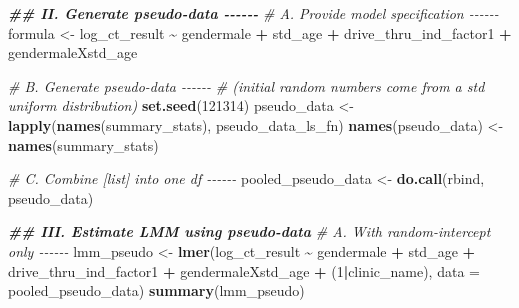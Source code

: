 \documentclass[
]{article}
\newenvironment{Shaded}{\begin{snugshade}}{\end{snugshade}}
\newcommand{\AttributeTok}[1]{\textcolor[rgb]{0.13,0.29,0.53}{#1}}
\newcommand{\CommentTok}[1]{\textcolor[rgb]{0.56,0.35,0.01}{\textit{#1}}}
\newcommand{\DecValTok}[1]{\textcolor[rgb]{0.00,0.00,0.81}{#1}}
\newcommand{\DocumentationTok}[1]{\textcolor[rgb]{0.56,0.35,0.01}{\textbf{\textit{#1}}}}
\newcommand{\FunctionTok}[1]{\textcolor[rgb]{0.13,0.29,0.53}{\textbf{#1}}}
\newcommand{\NormalTok}[1]{#1}
\newcommand{\OtherTok}[1]{\textcolor[rgb]{0.56,0.35,0.01}{#1}}
\newcommand{\SpecialCharTok}[1]{\textcolor[rgb]{0.81,0.36,0.00}{\textbf{#1}}}
\begin{document}
\begin{Shaded}
\begin{Highlighting}[]
\DocumentationTok{\#\# II. Generate pseudo{-}data {-}{-}{-}{-}{-}{-}}
\CommentTok{\# A. Provide model specification {-}{-}{-}{-}{-}{-}}
\NormalTok{formula }\OtherTok{\textless{}{-}}\NormalTok{ log\_ct\_result }\SpecialCharTok{\textasciitilde{}}\NormalTok{ gendermale }\SpecialCharTok{+}\NormalTok{ std\_age }\SpecialCharTok{+}\NormalTok{ drive\_thru\_ind\_factor1 }\SpecialCharTok{+}\NormalTok{ gendermaleXstd\_age }




\CommentTok{\# B. Generate pseudo{-}data {-}{-}{-}{-}{-}{-}}
\CommentTok{\# (initial random numbers come from a std uniform distribution)}
\FunctionTok{set.seed}\NormalTok{(}\DecValTok{121314}\NormalTok{)}
\NormalTok{pseudo\_data }\OtherTok{\textless{}{-}} \FunctionTok{lapply}\NormalTok{(}\FunctionTok{names}\NormalTok{(summary\_stats), pseudo\_data\_ls\_fn)}
\FunctionTok{names}\NormalTok{(pseudo\_data) }\OtherTok{\textless{}{-}} \FunctionTok{names}\NormalTok{(summary\_stats)}

\CommentTok{\# C. Combine [list] into one df {-}{-}{-}{-}{-}{-}}
\NormalTok{pooled\_pseudo\_data }\OtherTok{\textless{}{-}} \FunctionTok{do.call}\NormalTok{(rbind, pseudo\_data)}

\DocumentationTok{\#\# III. Estimate LMM using pseudo{-}data}
\CommentTok{\# A. With random{-}intercept only {-}{-}{-}{-}{-}{-}}
\NormalTok{lmm\_pseudo }\OtherTok{\textless{}{-}} \FunctionTok{lmer}\NormalTok{(log\_ct\_result }\SpecialCharTok{\textasciitilde{}}\NormalTok{ gendermale }\SpecialCharTok{+}\NormalTok{ std\_age }\SpecialCharTok{+}\NormalTok{ drive\_thru\_ind\_factor1 }\SpecialCharTok{+}\NormalTok{ gendermaleXstd\_age }\SpecialCharTok{+}\NormalTok{ (}\DecValTok{1}\SpecialCharTok{|}\NormalTok{clinic\_name), }\AttributeTok{data =}\NormalTok{ pooled\_pseudo\_data)}
\FunctionTok{summary}\NormalTok{(lmm\_pseudo)}
\end{Highlighting}
\end{Shaded}
\end{document}
